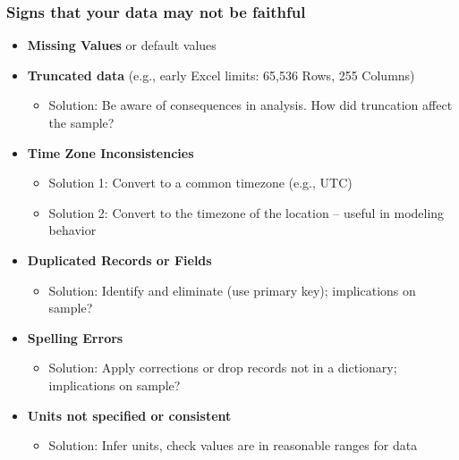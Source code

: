 \documentclass[aspectratio=169]{../latex_main/tntbeamer}  %
\begin{document}
\begin{frame}
\frametitle{Signs that your data may not be faithful}

\begin{itemize}
    \item \textbf{Missing Values} or default values
    \item \textbf{Truncated data} (e.g., early Excel limits: 65,536 Rows, 255 Columns)
    \begin{itemize}
        \item Solution: Be aware of consequences in analysis. How did truncation affect the sample?
    \end{itemize}
    \pause
    \item \textbf{Time Zone Inconsistencies}
    \begin{itemize}
        \item Solution 1: Convert to a common timezone (e.g., UTC)
        \item Solution 2: Convert to the timezone of the location – useful in modeling behavior
    \end{itemize}
    \pause
    \item \textbf{Duplicated Records or Fields}
    \begin{itemize}
        \item Solution: Identify and eliminate (use primary key); implications on sample?
    \end{itemize}
    \pause
    \item \textbf{Spelling Errors}
    \begin{itemize}
        \item Solution: Apply corrections or drop records not in a dictionary; implications on sample?
    \end{itemize}
    \pause
    \item \textbf{Units not specified or consistent}
    \begin{itemize}
        \item Solution: Infer units, check values are in reasonable ranges for data
    \end{itemize}
\end{itemize}

\end{frame}
\end{document}
